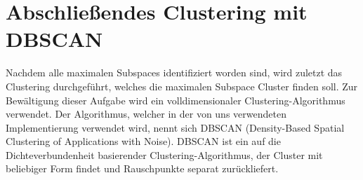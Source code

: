 \section{Abschließendes Clustering mit DBSCAN}\label{sec:chap6}

Nachdem alle maximalen Subspaces identifiziert worden sind, wird zuletzt das Clustering durchgeführt, welches die maximalen Subspace Cluster finden soll. Zur Bewältigung dieser Aufgabe wird ein volldimensionaler Clustering-Algorithmus verwendet. Der Algorithmus, welcher in der von uns verwendeten Implementierung verwendet wird, nennt sich DBSCAN (Density-Based Spatial Clustering of Applications with Noise). DBSCAN ist ein auf die Dichteverbundenheit basierender Clustering-Algorithmus, der Cluster mit beliebiger Form findet und Rauschpunkte separat zurückliefert.
